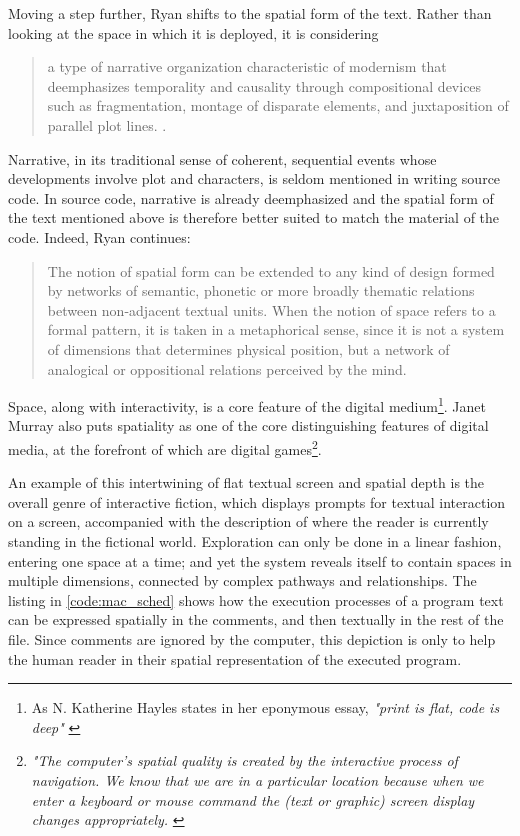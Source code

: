 Moving a step further, Ryan shifts to the spatial form of the text. Rather than looking at the space in which it is deployed, it is considering

\begin{quote}
    a type of narrative organization characteristic of modernism that deemphasizes temporality and causality through compositional devices such as fragmentation, montage of disparate elements, and juxtaposition of parallel plot lines. \citep{ryan_space_2009}.
\end{quote}

Narrative, in its traditional sense of coherent, sequential events whose developments involve plot and characters, is seldom mentioned in writing source code. In source code, narrative is already deemphasized and the spatial form of the text mentioned above is therefore better suited to match the material of the code. Indeed, Ryan continues:

\begin{quote}
    The notion of spatial form can be extended to any kind of design formed by networks of semantic, phonetic or more broadly thematic relations between non-adjacent textual units. When the notion of space refers to a formal pattern, it is taken in a metaphorical sense, since it is not a system of dimensions that determines physical position, but a network of analogical or oppositional relations perceived by the mind. \citep{ryan_space_2009}
\end{quote}

Space, along with interactivity, is a core feature of the digital medium\footnote{As N. Katherine Hayles states in her eponymous essay, \emph{"print is flat, code is deep"} \citep{hayles_print_2004}}. Janet Murray also puts spatiality as one of the core distinguishing features of digital media, at the forefront of which are digital games\footnote{\emph{"The computer's spatial quality is created by the interactive process of navigation. We know that we are in a particular location because when we enter a keyboard or mouse command the (text or graphic) screen display changes appropriately.} \citep{murray_hamlet_1998}}.

An example of this intertwining of flat textual screen and spatial depth is the overall genre of interactive fiction, which displays prompts for textual interaction on a screen, accompanied with the description of where the reader is currently standing in the fictional world. Exploration can only be done in a linear fashion, entering one space at a time; and yet the system reveals itself to contain spaces in multiple dimensions, connected by complex pathways and relationships. The listing in \ref{code:mac_sched} shows how the execution processes of a program text can be expressed spatially in the comments, and then textually in the rest of the file. Since comments are ignored by the computer, this depiction is only to help the human reader in their spatial representation of the executed program.

